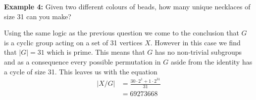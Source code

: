 \documentclass[../main.tex]{subfiles}
\begin{document}
    \textbf{Example 4:} Given two different colours of beads, how many unique necklaces of size 31 can you make?
    
    Using the same logic as the previous question we come to the conclusion that $G$ is a cyclic group acting on a set of 31 vertices $X$. However in this case we find that $\lvert G \rvert = 31$ which is prime. This means that $G$ has no non-trivial subgroups and as a consequence every possible permutation in $G$ aside from the identity has a cycle of size 31. This leaves us with the equation
        \begin{align*}
        \lvert X / G \rvert & = \frac{30 \cdot 2^1 + 1 \cdot 2^{31}}{31} \\
        & = 69273668
    \end{align*}
    
    
    
    

    
    
    
    
    
    
    
    
\end{document}

